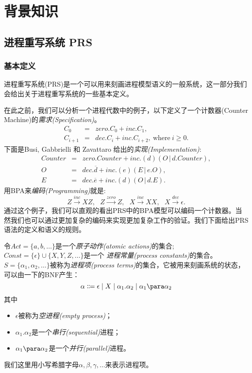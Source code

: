 \chapter{背景知识}
\label{chap:background}

\section{进程重写系统 PRS}
\label{sec-prs}

\subsection{基本定义}
进程重写系统(PRS)是一个可以用来刻画进程模型语义的一般系统，这一部分我们会给出关于进程重写系统的一些基本定义。

在此之前，我们可以分析一个进程代数中的例子\cite{Milner1989}，以下定义了一个计数器(Counter Machine)的\emph{需求(Specification)}。
\begin{eqnarray*}
C_{0} &=& zero.C_{0}+inc.C_{1}, \\
C_{i+1} &=& dec.C_{i}+inc.C_{i+2},\ \mathrm{where}\ i\ge0.
\end{eqnarray*}
下面是Busi, Gabbrielli 和 Zavattaro 给出的\emph{实现(Implementation)}\cite{Busi2003}:
\begin{eqnarray*}
Counter &=& zero.Counter+inc.(d)(O\,|\,d.Counter), \\
O &=& dec.\overline{d}+inc.(e)(E\,|\,e.O), \\
E &=& dec.\overline{e}+inc.(d)(O\,|\,d.E).
\end{eqnarray*}
用BPA来\emph{编码(Programming)}就是:
\[
Z \stackrel{inc}{\longrightarrow} XZ, \ \ \
Z \stackrel{zero}{\longrightarrow} Z, \ \ \
X \stackrel{inc}{\longrightarrow} XX, \ \ \
X \stackrel{dec}{\longrightarrow} \epsilon.
\]
通过这个例子，我们可以直观的看出PRS中的BPA模型可以编码一个计数器。当然我们也可以通过更加复杂的编码来实现更加复杂工作的验证。我们下面给出PRS语法的定义和语义的规则。

\begin{defn}\label{def-process term}
令$Act=\{a,b,\ldots\}$是一个\emph{原子动作(atomic actions)}的集合;$Const=\{\epsilon\}\cup\{X,Y,Z,\ldots\}$是一个 \emph{进程常量(process constants)}的集合。
$S=\{\alpha_1,\alpha_2,\ldots\}$被称为\emph{进程项(process terms)}的集合，它被用来刻画系统的状态，可以由一下的BNF产生：
$$\alpha\Coloneqq \epsilon\mid X\mid \alpha_1.\alpha_2\mid \alpha_1\para \alpha_2$$
其中
\begin{itemize}
\item $\epsilon$被称为\emph{空进程(empty process)}；
\item $\alpha_1.\alpha_2$是一个\emph{串行(sequential)}进程；
\item $\alpha_1\para \alpha_2$是一个\emph{并行(parallel)}进程。
\end{itemize}
我们这里用小写希腊字母$\alpha,\beta,\gamma,\ldots$来表示进程项。
\end{defn}

